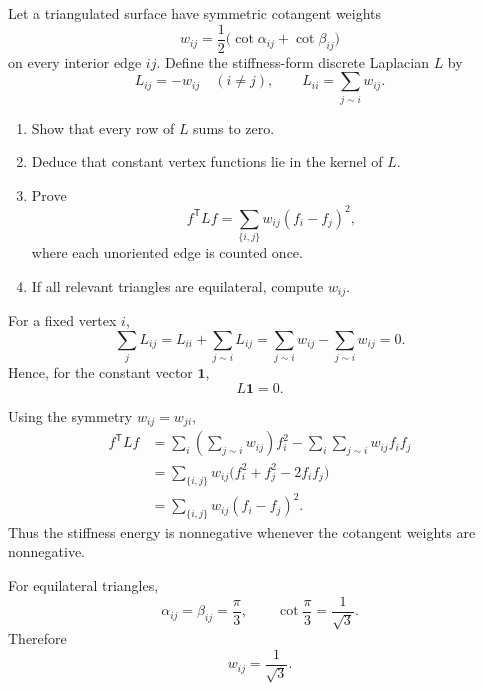 \begin{problem}
\label{prob:vii-gap-41}
Let a triangulated surface have symmetric cotangent weights
\[
w_{ij}=\frac12\bigl(\cot\alpha_{ij}+\cot\beta_{ij}\bigr)
\]
on every interior edge \(ij\).  Define the stiffness-form discrete
Laplacian \(L\) by
\[
L_{ij}=-w_{ij}\quad(i\ne j),
\qquad
L_{ii}=\sum_{j\sim i}w_{ij}.
\]

\begin{enumerate}
\item Show that every row of \(L\) sums to zero.
\item Deduce that constant vertex functions lie in the kernel of \(L\).
\item Prove
      \[
      f^{\mathsf T}Lf
      =
      \sum_{\{i,j\}}w_{ij}(f_i-f_j)^2,
      \]
      where each unoriented edge is counted once.
\item If all relevant triangles are equilateral, compute \(w_{ij}\).
\end{enumerate}
\end{problem}

\begin{solution}
For a fixed vertex \(i\),
\[
\sum_j L_{ij}
=
L_{ii}+\sum_{j\sim i}L_{ij}
=
\sum_{j\sim i}w_{ij}-\sum_{j\sim i}w_{ij}
=0.
\]
Hence, for the constant vector \(\mathbf 1\),
\[
L\mathbf 1=0.
\]

Using the symmetry \(w_{ij}=w_{ji}\),
\[
\begin{aligned}
f^{\mathsf T}Lf
&=
\sum_i\left(\sum_{j\sim i}w_{ij}\right)f_i^2
-\sum_i\sum_{j\sim i}w_{ij}f_if_j\\
&=
\sum_{\{i,j\}}w_{ij}
\bigl(f_i^2+f_j^2-2f_if_j\bigr)\\
&=
\sum_{\{i,j\}}w_{ij}(f_i-f_j)^2.
\end{aligned}
\]
Thus the stiffness energy is nonnegative whenever the cotangent weights
are nonnegative.

For equilateral triangles,
\[
\alpha_{ij}=\beta_{ij}=\frac{\pi}{3},
\qquad
\cot\frac{\pi}{3}=\frac1{\sqrt3}.
\]
Therefore
\[
\boxed{w_{ij}=\frac1{\sqrt3}}.
\]
\end{solution}
